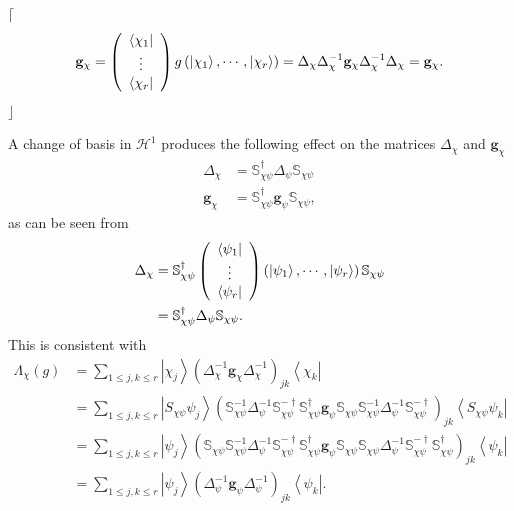 \documentclass[aps,preprint]{revtex4}%
\begin{document}
$\lceil$%
\begin{equation}
\mathbf{g}_{\chi}=\left(
\begin{array}
[c]{c}%
\left\langle \chi_{1}\right\vert \\
\vdots\\
\left\langle \chi_{r}\right\vert
\end{array}
\right)  g\left(  \left\vert \chi_{1}\right\rangle ,\cdots,\left\vert \chi
_{r}\right\rangle \right)  =\Delta_{\chi}\Delta_{\chi}^{-1}\mathbf{g}_{\chi
}\Delta_{\chi}^{-1}\Delta_{\chi}=\mathbf{g}_{\chi}.
\end{equation}
$\rfloor$

A change of basis in $\mathcal{H}^{1}$ produces the following effect on the
matrices $\Delta_{\chi}$ and $\mathbf{g}_{\chi}$
\begin{align}
\Delta_{\chi}  &  =\mathbb{S}_{\chi\psi}^{\dagger}\Delta_{\psi}\mathbb{S}%
_{\chi\psi}\nonumber\\
\mathbf{g}_{\chi}  &  =\mathbb{S}_{\chi\psi}^{\dagger}\mathbf{g}_{\psi
}\mathbb{S}_{\chi\psi},
\end{align}
as can be seen from
\begin{align}
\Delta_{\chi}  &  =\mathbb{S}_{\chi\psi}^{\dagger}\left(
\begin{array}
[c]{c}%
\left\langle \psi_{1}\right\vert \\
\vdots\\
\left\langle \psi_{r}\right\vert
\end{array}
\right)  \left(  \left\vert \psi_{1}\right\rangle ,\cdots,\left\vert \psi
_{r}\right\rangle \right)  \mathbb{S}_{\chi\psi}\nonumber\\
&  =\mathbb{S}_{\chi\psi}^{\dagger}\Delta_{\psi}\mathbb{S}_{\chi\psi}.
\end{align}
This is consistent with
\begin{align}
\Lambda_{\chi}\left(  g\right)   &  =\sum_{1\leq j,k\leq r}\left\vert \chi
_{j}\right\rangle \left(  \Delta_{\chi}^{-1}\mathbf{g}_{\chi}\Delta_{\chi
}^{-1}\right)  _{jk}\left\langle \chi_{k}\right\vert \nonumber\\
&  =\sum_{1\leq j,k\leq r}\left\vert S_{\chi\psi}\psi_{j}\right\rangle \left(
\mathbb{S}_{\chi\psi}^{-1}\Delta_{\psi}^{-1}\mathbb{S}_{\chi\psi}^{-\dagger
}\mathbb{S}_{\chi\psi}^{\dagger}\mathbf{g}_{\psi}\mathbb{S}_{\chi\psi
}\mathbb{S}_{\chi\psi}^{-1}\Delta_{\psi}^{-1}\mathbb{S}_{\chi\psi}^{-\dagger
}\right)  _{jk}\left\langle S_{\chi\psi}\psi_{k}\right\vert \nonumber\\
&  =\sum_{1\leq j,k\leq r}\left\vert \psi_{j}\right\rangle \left(
\mathbb{S}_{\chi\psi}\mathbb{S}_{\chi\psi}^{-1}\Delta_{\psi}^{-1}%
\mathbb{S}_{\chi\psi}^{-\dagger}\mathbb{S}_{\chi\psi}^{\dagger}\mathbf{g}%
_{\psi}\mathbb{S}_{\chi\psi}\mathbb{S}_{\chi\psi}\Delta_{\psi}^{-1}%
\mathbb{S}_{\chi\psi}^{-\dagger}\mathbb{S}_{\chi\psi}^{\dagger}\right)
_{jk}\left\langle \psi_{k}\right\vert \nonumber\\
&  =\sum_{1\leq j,k\leq r}\left\vert \psi_{j}\right\rangle \left(
\Delta_{\psi}^{-1}\mathbf{g}_{\psi}\Delta_{\psi}^{-1}\right)  _{jk}%
\left\langle \psi_{k}\right\vert .
\end{align}
\end{document}

